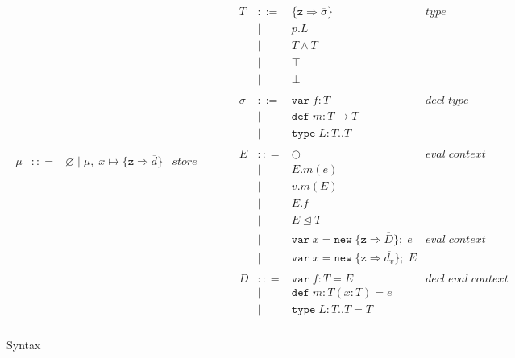 \documentclass{llncs}
\begin{document}
\begin{figure}[h]
\[\begin{array}{lll}
\begin{array}{lllr}
\mu & :: = & \varnothing \; | \; \mu,\; x \mapsto \{\texttt{z} \Rightarrow \overline{d}\} & store \\
\end{array}
& ~~~~~~
&
\begin{array}{lllr}
T & ::= & \{\texttt{z} \Rightarrow \overline{\sigma}\} & type \\
& | & p.L &\\
& | & T \wedge T & \\
& | & \top & \\
& | & \bot & \\
&&\\
\sigma & ::= & \texttt{var} \; f:T & decl \; type\\
       & |   & \texttt{def} \; m:T \rightarrow T \\
		 & |   & \texttt{type} \; L : T .. T &\\
&&\\
E & :: = & \bigcirc & eval \; context\\
       & | & E.m(e)\\
       & | & v.m(E)\\
       & | & E.f\\
       & | & E \unlhd T\\
       & | & \texttt{var} \; x = \texttt{new} \; \{\texttt{z} \Rightarrow \overline{D}\}; \; e & eval \; context \\
       & | & \texttt{var} \; x = \texttt{new} \; \{\texttt{z} \Rightarrow \overline{d_v}\}; \; E& \\
&&\\
D & :: = & \texttt{var} \; f : T = E & decl \; eval \; context \\
  & |   & \texttt{def} \; m : T(x:T) = e &\\
  & |   & \texttt{type} \; L : T .. T = T &\\
\end{array}
\end{array}
\]
\caption{Syntax}
\label{f:syntax}
\end{figure}
\end{document}
